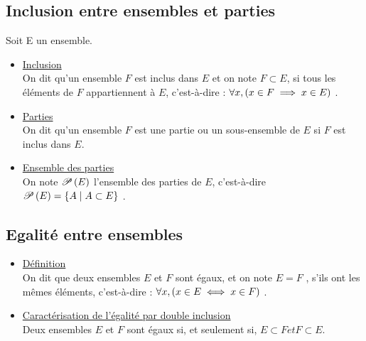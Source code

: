\subsection{Inclusion entre ensembles et parties}
\begin{defprop}
    Soit E un ensemble.
    \begin{itemize}
        \item \underline{Inclusion}\\ On dit qu’un ensemble \(F\) est inclus dans \(E\) et on note \(F \subset E\), si tous les éléments de \(F\) appartiennent à \(E\), c’est-à-dire : \(\forall x, \paren{x \in F \imp x \in E}\) .
        \item \underline{Parties}\\ On dit qu’un ensemble \(F\) est une partie ou un sous-ensemble de \(E\) si \(F\) est inclus dans \(E\).
        \item \underline{Ensemble des parties}\\ On note \(\P{E}\) l’ensemble des parties de \(E\), c’est-à-dire \(\P{E} = \accol{A \tq A \subset E}\) .
    \end{itemize}
\end{defprop}
\subsection{Egalité entre ensembles}
\begin{defprop}
    
\begin{itemize}
    \item  \underline{Définition}\\ On dit que deux ensembles \(E\) et \(F\) sont égaux, et on note \(E = F\) , s’ils ont les mêmes éléments, c’est-à-dire : \(\forall x, \paren{x \in E \iff x \in F }\) .
\item  \underline{Caractérisation de l’égalité par double inclusion}\\ Deux ensembles \(E\) et \(F\) sont égaux si, et seulement si, \(E \subset F et F \subset E\).
\end{itemize}
\end{defprop}

